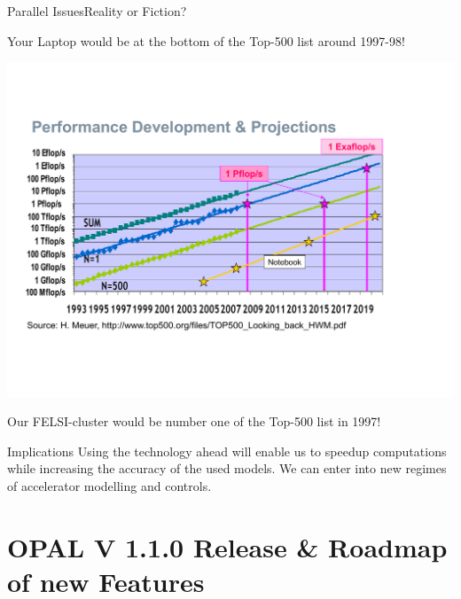 \documentclass[xcolor=pdftex,table,10pt,yellow,mathserif]{beamer}
\newcommand{\opal}{\textsc{OPAL }}
\begin{document}
\begin{frame}{Parallel Issues}{Reality or Fiction?}
\vspace{-0.2cm}
\begin{block}{}
Your Laptop would be at the bottom of the Top-500 list around 1997-98!
\end{block}
\vspace{-1cm}
   \begin{center}
      \includegraphics[scale=0.25]{figures/hans-proj}    
      \end{center}
  \vspace{-1.5cm}    
\begin{block}{}
Our FELSI-cluster would be number one of the Top-500 list in 1997!
\end{block}      
\begin{block}{Implications}
Using the technology ahead will enable us to speedup computations while increasing the accuracy of the used models. We can enter into
new regimes of accelerator modelling and controls.  
\end{block}     
\end{frame}


\section{\opal V 1.1.0 Release \& Roadmap of new Features}
\end{document}
